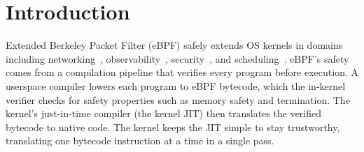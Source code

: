 




\section{Introduction}
\label{sec:introduction}

Extended Berkeley Packet Filter (eBPF) safely extends OS kernels in domains including networking~\cite{cilium,katran}, observability~\cite{bpftrace,bcc}, security~\cite{krsi_lwn,tracee}, and scheduling~\cite{sched_ext_lwn}.
eBPF's safety comes from a compilation pipeline that verifies every program before execution.
A userspace compiler lowers each program to eBPF bytecode, which the in-kernel verifier checks for safety properties such as memory safety and termination.
The kernel's just-in-time compiler (the kernel JIT) then translates the verified bytecode to native code.
The kernel keeps the JIT simple to stay trustworthy, translating one bytecode instruction at a time in a single pass.

